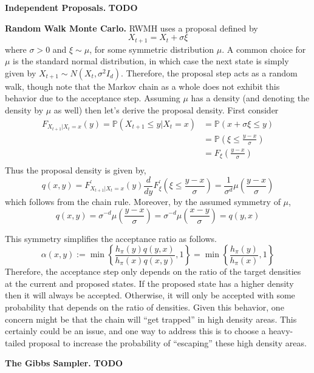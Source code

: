 \documentclass[12pt]{article}
\newcommand{\Prob}{\mathbb{P}}
\begin{document}
\bigskip

\textbf{Independent Proposals.} \textbf{TODO} 

\bigskip

\textbf{Random Walk Monte Carlo.} RWMH uses a proposal defined by
\[X_{t + 1} = X_t + \sigma \xi \]
where $\sigma > 0$ and $\xi \sim \mu$, for some symmetric distribution $\mu$. A common choice for $\mu$ is the standard normal distribution, in which case the next 
state is simply given by $X_{t + 1} \sim N(X_t, \sigma^2 I_d)$. Therefore, the proposal step acts as a random walk, though note that the Markov chain as a whole does not 
exhibit this behavior due to the acceptance step. Assuming $\mu$ has a density (and denoting the density by $\mu$ as well) then let's derive the proposal density. 
First consider
\begin{align*}
F_{X_{t + 1}|X_t=x}(y) = \Prob(X_{t + 1} \leq y|X_t=x) &= \Prob(x + \sigma \xi \leq y) \\
									 	 &= \Prob\left(\xi \leq \frac{y - x}{\sigma}\right) \\
									 	 &= F_{\xi}\left(\frac{y - x}{\sigma}\right) \\
\end{align*}
Thus the proposal density is given by, 
\[q(x, y) = F_{X_{t + 1}|X_t=x}^\prime(y) \frac{d}{dy}F_{\xi}^\prime \left(\xi \leq \frac{y - x}{\sigma}\right) = \frac{1}{\sigma^d}\mu\left(\frac{y - x}{\sigma}\right)\]
which follows from the chain rule. Moreover, by the assumed symmetry of $\mu$, 
\[q(x, y) = \sigma^{-d} \mu\left(\frac{y - x}{\sigma}\right) = \sigma^{-d} \mu\left(\frac{x - y}{\sigma}\right) = q(y, x)\]

This symmetry simplifies the acceptance ratio as follows.  
\[\alpha(x, y) := \min\left\{\frac{h_\pi(y) q(y, x)}{h_\pi(x)q(x, y)}, 1\right\} = \min\left\{\frac{h_\pi(y)}{h_\pi(x)}, 1\right\} \]
Therefore, the acceptance step only depends on the ratio of the target densities at the current and proposed states. If the proposed state has a higher density then it will 
always be accepted. Otherwise, it will only be accepted with some probability that depends on the ratio of densities. Given this behavior, one concern might be that the 
chain will ``get trapped'' in high density areas. This certainly could be an issue, and one way to address this is to choose a heavy-tailed proposal to increase the probability
of ``escaping'' these high density areas. 

\bigskip

\textbf{The Gibbs Sampler.} \textbf{TODO} 
\end{document}

